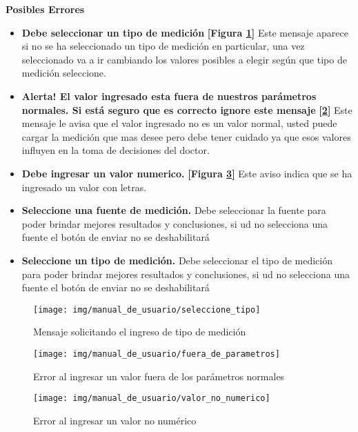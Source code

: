 \begin{itemize}
 	\textbf{Posibles Errores}
 	\begin{itemize}
 		\item \textbf{Debe seleccionar un tipo de medición} \textbf{[Figura \ref{mu-analisis-seleccione_tipo}]} Este mensaje aparece si no se ha seleccionado un tipo de medición en particular, una vez seleccionado va a ir cambiando los valores posibles a elegir según que tipo de medición seleccione.
 		\item \textbf{Alerta! El valor ingresado esta fuera de nuestros parámetros normales. Si está seguro que es correcto ignore este mensaje} \textbf{[\ref{mu-analisis-fuera_de_parametros}]} Este mensaje le avisa que el valor ingresado no es un valor normal, usted puede cargar la medición que mas desee pero debe tener cuidado ya que esos valores influyen en la toma de decisiones del doctor.
 		\item \textbf{Debe ingresar un valor numerico.} \textbf{[Figura \ref{mu-analisis-valor_no_numerico}]} Este aviso indica que se ha ingresado un valor con letras.
 		\item \textbf{Seleccione una fuente de medición.} Debe seleccionar la fuente para poder brindar mejores resultados y conclusiones, si ud no selecciona una fuente el botón de enviar no se deshabilitará
 		\item \textbf{Seleccione un tipo de medición.} Debe seleccionar el tipo de medición para poder brindar mejores resultados y conclusiones, si ud no selecciona una fuente el botón de enviar no se deshabilitará
 	\end{itemize}
 \end{itemize}
 
 \begin{figure}
 	\centering
 	\texttt{[image: img/manual\_de\_usuario/seleccione\_tipo]}
 	\caption{Mensaje solicitando el ingreso de tipo de medición}
 	\label{mu-analisis-seleccione_tipo}
 \end{figure}
 
 
 \begin{figure}
 	\centering
 	\texttt{[image: img/manual\_de\_usuario/fuera\_de\_parametros]}
 	\caption{Error al ingresar un valor fuera de los parámetros normales}
 	\label{mu-analisis-fuera_de_parametros}
 \end{figure}
 
 
 \begin{figure}
 	\centering
 	\texttt{[image: img/manual\_de\_usuario/valor\_no\_numerico]}
 	\caption{Error al ingresar un valor no numérico}
 	\label{mu-analisis-valor_no_numerico}
 \end{figure}
 
